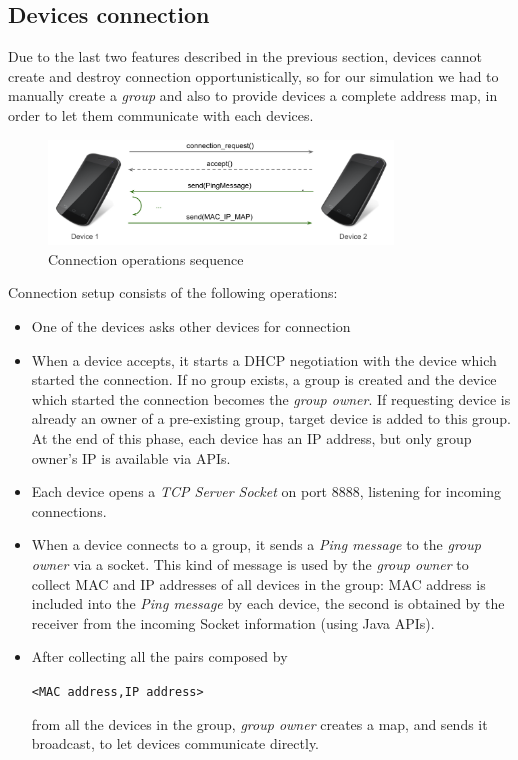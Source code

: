 \subsection{Devices connection}

Due to the last two \direct features described in the previous section, devices cannot create and destroy connection opportunistically, so for our simulation we had to 
manually create a \direct \textit{group} and also to provide devices a complete address map, in order to let them communicate with each
devices.

\begin{figure}[!htbp]
\centering
\includegraphics[width=3.6in]{imgs/device_connection_ops.pdf}
\caption{Connection operations sequence}
\label{fig:device_connection}
\end{figure}

Connection setup consists of the following operations:
	\begin{itemize}
		\item One of the devices asks other devices for connection
		\item When a device accepts, it starts a DHCP negotiation with the device which started the connection. If no \direct group exists, a group is created and the device which started the connection becomes the \textit{group owner}. If requesting device is already an owner of a pre-existing group, target device is added to this group. At the end of this phase, each device has an IP address, but only group owner's IP is available via \direct APIs. 
		\item Each device opens a \textit{TCP Server Socket} on port 8888, listening for incoming connections.
		\item When a device connects to a group, it sends a \textit{Ping message} to the \textit{group owner} via a socket. This kind of message is used by the \textit{group owner} to collect MAC and IP addresses of all devices in the group: MAC address is included into the \emph{Ping message} by each device, the second is obtained by the receiver from the incoming Socket information (using Java APIs).
		\item After collecting all the pairs composed by \begin{center}\tt{<MAC address,IP address>}\end{center} from all the devices in the group, \textit{group owner} creates a map, and sends it broadcast, to let devices communicate directly.
	\end{itemize}

